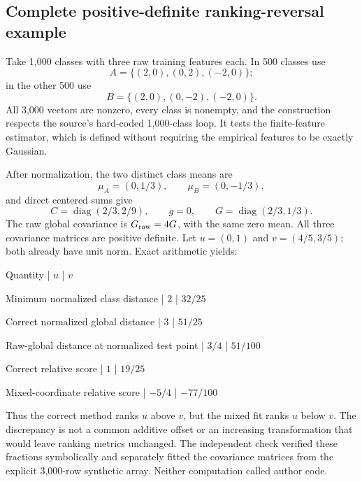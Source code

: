\documentclass[10pt]{article}
\begin{document}
\subsection*{Complete positive-definite ranking-reversal example}
Take 1,000 classes with three raw training features each. In 500 classes use \[A=\{(2,0),(0,2),(-2,0)\};\] in the other 500 use \[B=\{(2,0),(0,-2),(-2,0)\}.\] All 3,000 vectors are nonzero, every class is nonempty, and the construction respects the source’s hard-coded 1,000-class loop. It tests the finite-feature estimator, which is defined without requiring the empirical features to be exactly Gaussian.\par
After normalization, the two distinct class means are \[\mu_A=(0,1/3),\qquad \mu_B=(0,-1/3),\] and direct centered sums give \[C=\operatorname{diag}(2/3,2/9),\qquad
 g=0,\qquad G=\operatorname{diag}(2/3,1/3).\] The raw global covariance is \(G_{\rm raw}=4G\), with the same zero mean. All three covariance matrices are positive definite. Let \(u=(0,1)\) and \(v=(4/5,3/5)\); both already have unit norm. Exact arithmetic yields:\par
Quantity | \(u\) | \(v\)\par
Minimum normalized class distance | \(2\) | \(32/25\)\par
Correct normalized global distance | \(3\) | \(51/25\)\par
Raw-global distance at normalized test point | \(3/4\) | \(51/100\)\par
Correct relative score | \(1\) | \(19/25\)\par
Mixed-coordinate relative score | \(-5/4\) | \(-77/100\)\par
Thus the correct method ranks \(u\) above \(v\), but the mixed fit ranks \(u\) below \(v\). The discrepancy is not a common additive offset or an increasing transformation that would leave ranking metrics unchanged. The independent check verified these fractions symbolically and separately fitted the covariance matrices from the explicit 3,000-row synthetic array. Neither computation called author code.\par
\end{document}
